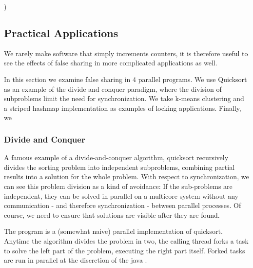 )




\subsection{Practical Applications}
We rarely make software that simply increments counters, it is therefore useful
to see the effects of false sharing in more complicated applications as well.

In this section we examine false sharing in 4  parallel programs. We use Quicksort as an example of the divide and
conquer paradigm, where the division of subproblems limit the need for
synchronization. We take k-means clustering and a striped hashmap implementation
as examples of locking applications. Finally, we 

\subsubsection{Divide and Conquer }
A famous example of a divide-and-conquer algorithm, quicksort recursively
divides the sorting problem into independent subproblems, combining partial
results into a solution for the whole problem. With respect to synchronization,
we can see this problem division as a kind of avoidance: If the sub-problems are
independent, they can be solved in parallel on a multicore system without any
communication - and therefore synchronization - between parallel processes.
Of course, we need to ensure that solutions are visible after they are
found.


The program is a (somewhat naive) parallel implementation of quicksort. Anytime
the algorithm divides the problem in two, the calling thread forks a task to
solve the left part of the problem, executing the right part itself. Forked
tasks are run in parallel at the discretion of the java .

